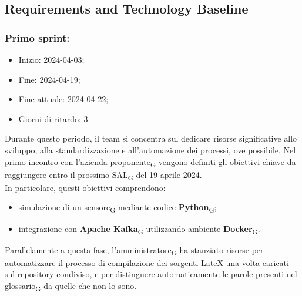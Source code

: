 \subsection{Requirements and Technology Baseline}
\subsubsection{Primo sprint:}
\begin{itemize}
	\item Inizio: 2024-04-03;
	\item Fine: 2024-04-19;
	\item Fine attuale: 2024-04-22;
	\item Giorni di ritardo: 3.
\end{itemize}

Durante questo periodo, il team si concentra sul dedicare risorse significative allo sviluppo, alla standardizzazione e all'automazione dei processi, ove possibile. Nel primo incontro con l'azienda \href{https://7last.github.io/docs/rtb/documentazione-interna/glossario\#proponente}{proponente\textsubscript{G}} vengono definiti gli obiettivi chiave da raggiungere entro il prossimo \href{https://7last.github.io/docs/rtb/documentazione-interna/glossario\#stato-avanzamento-lavori}{SAL\textsubscript{G}} del 19 aprile 2024. \\
In particolare, questi obiettivi comprendono:
\begin{itemize}
	\item simulazione di un \href{https://7last.github.io/docs/rtb/documentazione-interna/glossario\#sensore}{sensore\textsubscript{G}} mediante codice \href{https://7last.github.io/docs/rtb/documentazione-interna/glossario\#python}{\textbf{Python}\textsubscript{G}};
	\item integrazione con \href{https://7last.github.io/docs/rtb/documentazione-interna/glossario\#apache-kafka}{\textbf{Apache Kafka}\textsubscript{G}} utilizzando ambiente \href{https://7last.github.io/docs/rtb/documentazione-interna/glossario\#docker}{\textbf{Docker}\textsubscript{G}}.
\end{itemize}
Parallelamente a questa fase, l'\href{https://7last.github.io/docs/rtb/documentazione-interna/glossario\#amministratore}{amministratore\textsubscript{G}} ha stanziato risorse per automatizzare il processo di compilazione dei sorgenti LateX una volta caricati sul repository condiviso, e per distinguere automaticamente le parole presenti nel \href{https://7last.github.io/docs/rtb/documentazione-interna/glossario#glossario}{glossario\textsubscript{G}} da quelle che non lo sono.

